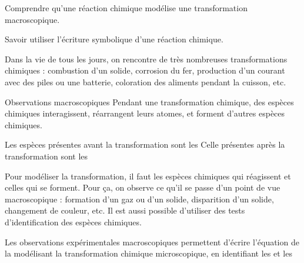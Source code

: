 \teteSndChim


\begin{objectifs}
  \item Comprendre qu'une réaction chimique modélise une transformation macroscopique.
  \item Savoir utiliser l'écriture symbolique d'une réaction chimique.
\end{objectifs}

\begin{contexte}
  Dans la vie de tous les jours, on rencontre de très nombreuses transformations chimiques : combustion d'un solide, corrosion du fer, production d'un courant avec des piles ou une batterie, coloration des aliments pendant la cuisson, etc.
  
\end{contexte}


\begin{doc}{Observations macroscopiques}
  Pendant une transformation chimique, des espèces chimiques interagissent, réarrangent leurs atomes, et forment d'autres espèces chimiques.

  \begin{importants}  
    Les espèces présentes avant la transformation sont les 
    Celle présentes après la transformation sont les 
  \end{importants}
  
  Pour modéliser la transformation, il faut  les espèces chimiques qui réagissent et celles qui se forment.
  Pour ça, on observe ce qu'il se passe d'un point de vue macroscopique : formation d'un gaz ou d'un solide, disparition d'un solide, changement de couleur, etc.
  Il est aussi possible d'utiliser des tests d'identification des espèces chimiques.
  
  \begin{importants}
    Les observations expérimentales macroscopiques permettent d'écrire l'équation de la  modélisant la transformation chimique microscopique, en identifiant les  et les 
  \end{importants}
\end{doc}


